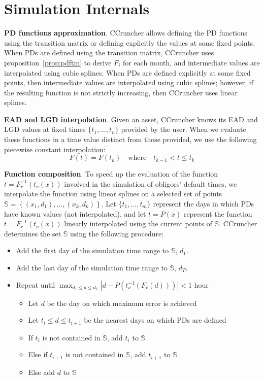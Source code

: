 \documentclass[11pt,fleqn]{book} %
\begin{document}
\section{Simulation Internals}

\textbf{PD functions approximation}. CCruncher allows defining the PD
functions using the transition matrix or defining explicitly the values
at some fixed points. When PDs are defined using the transition matrix, 
CCruncher uses proposition~\ref{prop:pdftm} to derive $F_i$ for each 
month, and intermediate values are interpolated using cubic splines. 
When PDs are defined explicitly at some fixed points, then intermediate 
values are interpolated using cubic splines; however, if the resulting 
function is not strictly increasing, then CCruncher uses linear splines.

\textbf{EAD and LGD interpolation}. Given an asset, CCruncher knows its EAD 
and LGD values at fixed times $\{t_1,\dots,t_n\}$ provided by the user. When 
we evaluate these functions in a time value distinct from those provided, we 
use the following piecewise constant interpolation:
\begin{displaymath}
	F(t) = F(t_k) \quad \text{where} \quad t_{k-1} < t \le t_{k}
\end{displaymath}

\textbf{Function composition}. To speed up the evaluation of the function 
$t=F_r^{-1}(t_{\nu}(x))$ involved in the simulation of obligors' default 
times, we interpolate the function using linear splines on a selected set 
of points $\mathbb{S} = \left\{(x_1,d_1),\dots,(x_k,d_k)\right\}$. 
Let $\{t_1,\dots,t_m\}$ represent the days in which PDs have known values 
(not interpolated), and let $t=P(x)$ represent the function 
$t=F_r^{-1}(t_{\nu}(x))$ linearly interpolated using the current points 
of $\mathbb{S}$. CCruncher determines the set $\mathbb{S}$ using the 
following procedure:
\begin{itemize}
	\item Add the first day of the simulation time range to $\mathbb{S}$, $d_1$.
	\item Add the last day of the simulation time range to $\mathbb{S}$, $d_T$.
	\item Repeat until $\displaystyle \max_{d_1 \le d \le d_T}\left|d - P(t_{\nu}^{-1}(F_r(d)))\right| < 1$ hour
	\begin{itemize}
		\item Let $d$ be the day on which maximum error is achieved
		\item Let $t_i \le d \le t_{i+1}$ be the nearest days on which PDs are defined
		\item If $t_i$ is not contained in $\mathbb{S}$, add $t_i$ to $\mathbb{S}$
		\item Else if $t_{i+1}$ is not contained in $\mathbb{S}$, add $t_{i+1}$ to $\mathbb{S}$
		\item Else add $d$ to $\mathbb{S}$
	\end{itemize}
\end{itemize}
\end{document}
